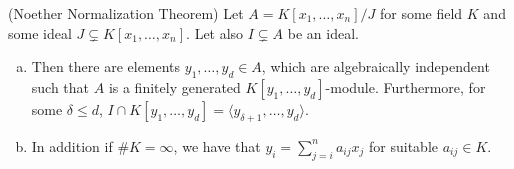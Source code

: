     \begin{theorem}\label{NoetherNormalizationLemma}
        (Noether Normalization Theorem)  Let $A = K[x_1,\dots,x_n]/J$ for some field $K$ and some ideal $J \subsetneq K[x_1,\dots,x_n]$. Let also $I\subsetneq A$ be an ideal. 
        \begin{enumerate}[(a)] 
            \item Then there are elements $y_1,\dots, y_d\in A$, which are algebraically independent such that $A$ is a finitely generated $K[y_1,\dots,y_d]$-module. Furthermore, for some $\delta \leq d$, $I\cap K[y_1,\dots,y_d] = \langle y_{\delta+1},\dots,y_d \rangle$. 
            \item In addition if $\#K = \infty$, we have that $y_i = \sum_{j=i}^n a_{ij}x_j$ for suitable $a_{ij} \in K$.
        \end{enumerate}
    \end{theorem}
